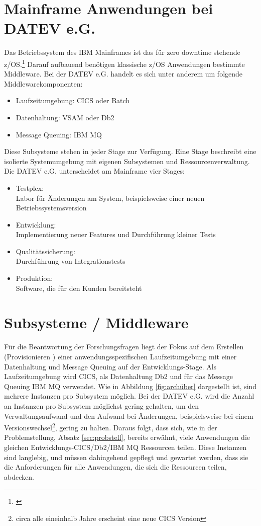 \section{Mainframe Anwendungen bei DATEV e.G.}\label{sec:zosanw}
Das Betriebssystem des IBM Mainframes ist das für zero downtime stehende z/OS.\footnote{\cite{Ebbers.2011}}
Darauf aufbauend benötigen klassische z/OS Anwendungen bestimmte Middleware.
Bei der DATEV e.G. handelt es sich unter anderem um folgende Middlewarekomponenten:

\begin{itemize}
\item Laufzeitumgebung: CICS oder Batch
\item Datenhaltung: VSAM oder Db2
\item Message Queuing: IBM MQ
\end{itemize}

Diese Subsysteme stehen in jeder Stage zur Verfügung.
Eine Stage beschreibt eine isolierte Systemumgebung mit eigenen Subsystemen und Ressourcenverwaltung.
Die DATEV e.G. unterscheidet am Mainframe vier Stages:
\begin{samepage}
\begin{itemize}
\item Testplex:\\
Labor für Änderungen am System, beispielsweise einer neuen Betriebssystemsversion
\item Entwicklung:\\
Implementierung neuer Features und Durchführung kleiner Tests
\item Qualitätssicherung:\\
Durchführung von Integrationstests
\item Produktion:\\
Software, die für den Kunden bereitsteht
\end{itemize}
\end{samepage}

\section{Subsysteme / Middleware}
Für die Beantwortung der Forschungsfragen liegt der Fokus auf dem Erstellen (\glqq Provisionieren \grqq) einer anwendungsspezifischen Laufzeitumgebung mit einer Datenhaltung und Message Queuing auf der Entwicklungs-Stage.
Als Laufzeitumgebung wird \glqq CICS\grqq, als Datenhaltung \glqq Db2\grqq{} und für das Message Queuing \glqq IBM MQ\grqq{} verwendet.
Wie in Abbildung \ref{fig:archüber} dargestellt ist, sind mehrere Instanzen pro Subsystem möglich.
Bei der DATEV e.G. wird die Anzahl an Instanzen pro Subsystem möglichst gering gehalten, um den Verwaltungsaufwand und den Aufwand bei Änderungen, beispielsweise bei einem Versionswechsel\footnote{circa alle eineinhalb Jahre erscheint eine neue CICS Version}, gering zu halten.
Daraus folgt, dass sich, wie in der Problemstellung, Absatz \ref{sec:probstell}, bereits erwähnt, viele Anwendungen die gleichen Entwicklungs-CICS/Db2/IBM MQ Ressourcen teilen.
Diese Instanzen sind langlebig, und müssen dahingehend gepflegt und gewartet werden, dass sie die Anforderungen für alle Anwendungen, die sich die Ressourcen teilen, abdecken. 

